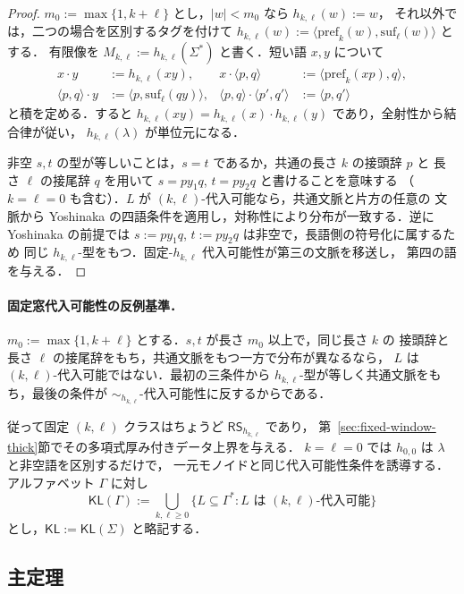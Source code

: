 \documentclass[11pt,a4paper]{ltjsarticle}
\theoremstyle{remark}
\theoremstyle{plain}
\newcommand{\pref}{\mathrm{pref}}
\newcommand{\suf}{\mathrm{suf}}
\begin{document}
\begin{proof}
$m_0:=\max\{1,k+\ell\}$ とし，$|w|<m_0$ なら $h_{k,\ell}(w):=w$，
それ以外では，二つの場合を区別するタグを付けて
$h_{k,\ell}(w):=\langle\pref_k(w),\suf_\ell(w)\rangle$ とする．
有限像を $M_{k,\ell}:=h_{k,\ell}(\Sigma^*)$ と書く．短い語 $x,y$ について
\[
\begin{aligned}
x\cdot y&:=h_{k,\ell}(xy),&
x\cdot\langle p,q\rangle&:=\langle\pref_k(xp),q\rangle,\\
\langle p,q\rangle\cdot y&:=\langle p,\suf_\ell(qy)\rangle,&
\langle p,q\rangle\cdot\langle p',q'\rangle&:=\langle p,q'\rangle
\end{aligned}
\]
と積を定める．すると
$h_{k,\ell}(xy)=h_{k,\ell}(x)\cdot h_{k,\ell}(y)$ であり，全射性から結合律が従い，
$h_{k,\ell}(\lambda)$ が単位元になる．

非空 $s,t$ の型が等しいことは，$s=t$ であるか，共通の長さ $k$ の接頭辞 $p$ と
長さ $\ell$ の接尾辞 $q$ を用いて $s=py_1q$, $t=py_2q$ と書けることを意味する
（$k=\ell=0$ も含む）．$L$ が $(k,\ell)$-代入可能なら，共通文脈と片方の任意の
文脈から Yoshinaka の四語条件を適用し，対称性により分布が一致する．逆に
Yoshinaka の前提では $s:=py_1q$, $t:=py_2q$ は非空で，長語側の符号化に属するため
同じ $h_{k,\ell}$-型をもつ．固定-$h_{k,\ell}$ 代入可能性が第三の文脈を移送し，
第四の語を与える．
\end{proof}

\label{crit:kl}
\paragraph{固定窓代入可能性の反例基準．}
$m_0:=\max\{1,k+\ell\}$ とする．$s,t$ が長さ $m_0$ 以上で，同じ長さ $k$ の
接頭辞と長さ $\ell$ の接尾辞をもち，共通文脈をもつ一方で分布が異なるなら，
$L$ は $(k,\ell)$-代入可能ではない．最初の三条件から
$h_{k,\ell}$-型が等しく共通文脈をもち，最後の条件が
$\sim_{h_{k,\ell}}$-代入可能性に反するからである．

従って固定 $(k,\ell)$ クラスはちょうど $\mathsf{RS}_{h_{k,\ell}}$ であり，
第~\ref{sec:fixed-window-thick}節でその多項式厚み付きデータ上界を与える．
$k=\ell=0$ では $h_{0,0}$ は $\lambda$ と非空語を区別するだけで，
一元モノイドと同じ代入可能性条件を誘導する．アルファベット $\Gamma$ に対し
\[
\mathsf{KL}(\Gamma):=
\bigcup_{k,\ell\ge0}
\{L\subseteq\Gamma^*:L\text{ は $(k,\ell)$-代入可能}\}
\]
とし，$\mathsf{KL}:=\mathsf{KL}(\Sigma)$ と略記する．

\subsection{主定理}
\end{document}
